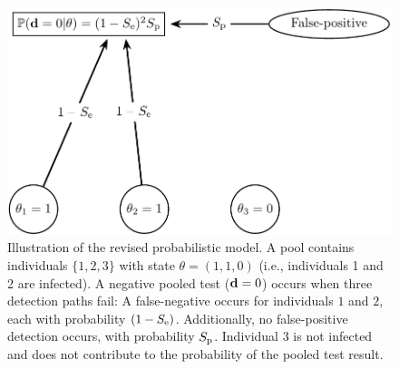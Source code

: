 \documentclass{article}
\begin{document}
\begin{figure}[H]
  \centering
  \includegraphics[width=\textwidth]{model_pic.jpg}

      

  \caption{Illustration of the revised probabilistic model. A pool
    contains individuals $\{1,2,3\}$ with state $\theta=(1,1,0)$
    (i.e., individuals 1 and 2 are infected). A negative pooled test
    ($\mathbf{d}=0$) occurs when three detection paths fail: A
    false-negative occurs for individuals $1$ and $2$, each with
    probability $(1-S_{\text{e}})$.  Additionally, no false-positive
    detection occurs, with probability $S_{\text{p}}$. Individual $3$ is not
    infected and does not contribute to the probability of the pooled
    test result.}\label{fig:likelihood}
\end{figure}
\end{document}
